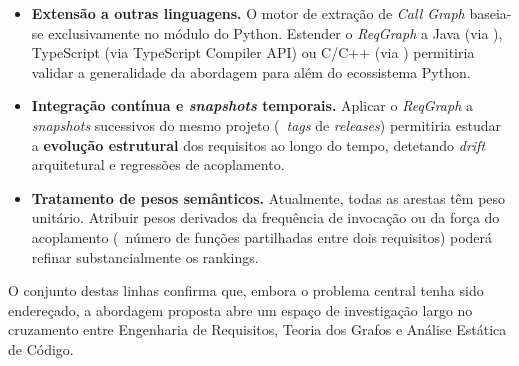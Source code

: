 \begin{itemize}
    \item \textbf{Extensão a outras linguagens.} O motor de
        extração de \emph{Call Graph} baseia-se exclusivamente no
        módulo  do Python. Estender o \emph{ReqGraph} a
        Java (via ), TypeScript (via TypeScript
        Compiler API) ou C/C++ (via ) permitiria
        validar a generalidade da abordagem para além do
        ecossistema Python.

    \item \textbf{Integração contínua e \emph{snapshots}
        temporais.} Aplicar o \emph{ReqGraph} a \emph{snapshots}
        sucessivos do mesmo projeto (\eg\ \emph{tags} de
        \emph{releases}) permitiria estudar a \textbf{evolução
        estrutural} dos requisitos ao longo do tempo, detetando
        \emph{drift} arquitetural e regressões de acoplamento.

    \item \textbf{Tratamento de pesos semânticos.} Atualmente, todas
        as arestas têm peso unitário. Atribuir pesos derivados da
        frequência de invocação ou da força do acoplamento
        (\eg\ número de funções partilhadas entre dois requisitos)
        poderá refinar substancialmente os rankings.
\end{itemize}

O conjunto destas linhas confirma que, embora o problema central
tenha sido endereçado, a abordagem proposta abre um espaço de
investigação largo no cruzamento entre Engenharia de Requisitos,
Teoria dos Grafos e Análise Estática de Código.
